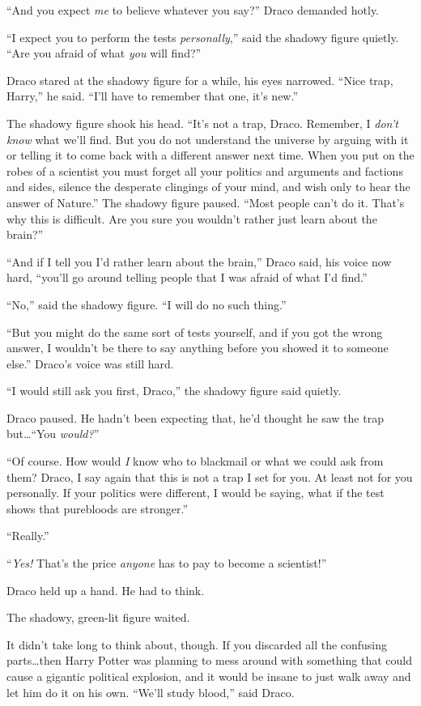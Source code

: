 “And you expect \emph{me} to believe whatever you say?” Draco demanded hotly.

“I expect you to perform the tests \emph{personally},” said the shadowy figure quietly. “Are you afraid of what \emph{you} will find?”

Draco stared at the shadowy figure for a while, his eyes narrowed. “Nice trap, Harry,” he said. “I’ll have to remember that one, it’s new.”

The shadowy figure shook his head. “It’s not a trap, Draco. Remember, I \emph{don’t know} what we’ll find. But you do not understand the universe by arguing with it or telling it to come back with a different answer next time. When you put on the robes of a scientist you must forget all your politics and arguments and factions and sides, silence the desperate clingings of your mind, and wish only to hear the answer of Nature.” The shadowy figure paused. “Most people can’t do it. That’s why this is difficult. Are you sure you wouldn’t rather just learn about the brain?”

“And if I tell you I’d rather learn about the brain,” Draco said, his voice now hard, “you’ll go around telling people that I was afraid of what I’d find.”

“No,” said the shadowy figure. “I will do no such thing.”

“But you might do the same sort of tests yourself, and if you got the wrong answer, I wouldn’t be there to say anything before you showed it to someone else.” Draco’s voice was still hard.

“I would still ask you first, Draco,” the shadowy figure said quietly.

Draco paused. He hadn’t been expecting that, he’d thought he saw the trap but…“You \emph{would?}”

“Of course. How would \emph{I} know who to blackmail or what we could ask from them? Draco, I say again that this is not a trap I set for you. At least not for you personally. If your politics were different, I would be saying, what if the test shows that purebloods are stronger.”

“Really.”

“\emph{Yes!} That’s the price \emph{anyone} has to pay to become a scientist!”

Draco held up a hand. He had to think.

The shadowy, green-lit figure waited.

It didn’t take long to think about, though. If you discarded all the confusing parts…then Harry Potter was planning to mess around with something that could cause a gigantic political explosion, and it would be insane to just walk away and let him do it on his own. “We’ll study blood,” said Draco.

